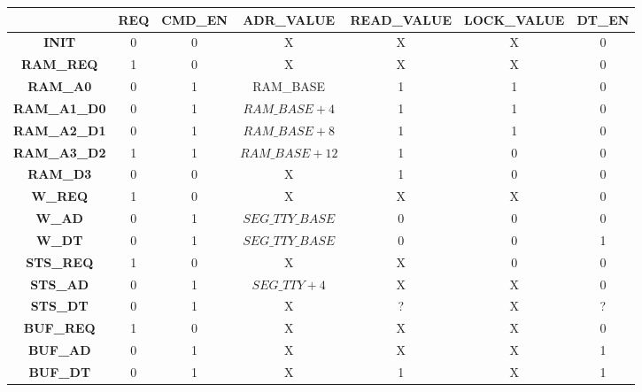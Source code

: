 \documentclass[10pt]{article}
\begin{document}
\begin{tabular}{|c|c|c|c|c|c|c|}
  \hline
  & REQ & CMD\_EN & ADR\_VALUE & READ\_VALUE & LOCK\_VALUE & DT\_EN \\ \hline
  {\bf INIT} & 0 & 0 & X & X & X & 0 \\ \hline
  {\bf RAM\_REQ} & 1 & 0 & X & X & X & 0 \\ \hline
  {\bf RAM\_A0} & 0 & 1 & RAM\_BASE & 1 & 1 & 0 \\ \hline
  {\bf RAM\_A1\_D0} & 0 & 1 & $RAM\_BASE + 4$ & 1 & 1 & 0 \\ \hline
  {\bf RAM\_A2\_D1} & 0 & 1 & $RAM\_BASE + 8$ & 1 & 1 & 0 \\ \hline
  {\bf RAM\_A3\_D2} & 1 & 1 & $RAM\_BASE + 12$ & 1 & 0 & 0 \\ \hline
  {\bf RAM\_D3} & 0 & 0 & X & 1 & 0 & 0 \\ \hline
  {\bf W\_REQ} & 1 & 0 & X & X & X & 0 \\ \hline
  {\bf W\_AD} & 0 & 1 & $SEG\_TTY\_BASE$ & 0 & 0 & 0 \\ \hline
  {\bf W\_DT} & 0 & 1 & $SEG\_TTY\_BASE$ & 0 & 0 & 1 \\ \hline
  {\bf STS\_REQ} & 1 & 0 & X & X & 0 & 0 \\ \hline
  {\bf STS\_AD} & 0 & 1 & $SEG\_TTY + 4$ & X & X & 0 \\ \hline
  {\bf STS\_DT} & 0 & 1 & X & ? & X & ? \\ \hline
  {\bf BUF\_REQ} & 1 & 0 & X & X & X & 0 \\ \hline
  {\bf BUF\_AD} & 0 & 1 & X & X & X & 1 \\ \hline
  {\bf BUF\_DT} & 0 & 1 & X & 1 & X & 1 \\ \hline
\end{tabular}

\newpage
\end{document}
